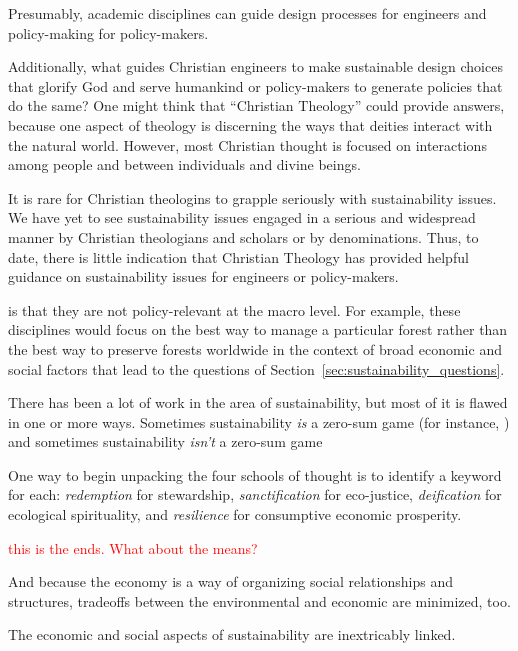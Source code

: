 \documentclass[12pt]{article}
\newcommand{\ins}[1]{\textcolor{red}{#1}}
\begin{document}
Presumably, academic disciplines can guide design processes for engineers
and policy-making for policy-makers.




Additionally, what guides Christian engineers to make sustainable design choices
that glorify God and serve humankind
or policy-makers to generate policies that do the same?
One might think that ``Christian Theology'' could provide answers, because
one aspect of theology is discerning the 
ways that deities interact with the natural world. 
However, most Christian thought is focused on interactions among people 
and between individuals and divine beings.

It is rare for Christian theologins to grapple seriously with 
sustainability issues.
We have yet to see sustainability issues engaged in a serious and widespread manner
by Christian theologians and scholars or by denominations.
Thus, to date, there is little indication that Christian Theology 
has provided helpful guidance on sustainability issues
for engineers or policy-makers.



is that they are not policy-relevant
at the macro level. 
For example, these disciplines would focus on the best way to manage a particular forest 
rather than the best way to preserve forests worldwide
in the context of broad economic and social factors
that lead to the questions of Section~\ref{sec:sustainability_questions}.

There has been a lot of work in the area of sustainability, but most of it is flawed in one or more ways.
Sometimes sustainability \emph{is} a zero-sum game 
(for instance, )
and sometimes sustainability \emph{isn't} a zero-sum game 



One way to begin unpacking the four schools of thought 
is to identify a keyword for each:
\emph{redemption} for stewardship, 
\emph{sanctification} for eco-justice,
\emph{deification} for ecological spirituality, and
\emph{resilience} for consumptive economic prosperity.



\ins{this is the ends. What about the means?}

And because the economy is a way of organizing social relationships and structures,
tradeoffs between the environmental and economic are minimized, too.


The economic and social aspects of sustainability are inextricably linked. 
\end{document}

